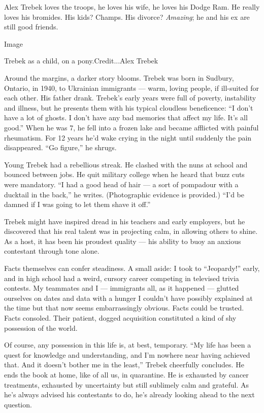 Alex Trebek loves the troops, he loves his wife, he loves his Dodge Ram.
He really loves his bromides. His kids? Champs. His divorce?
\emph{Amazing}; he and his ex are still good friends.

Image

Trebek as a child, on a pony.Credit...Alex Trebek

Around the margins, a darker story blooms. Trebek was born in Sudbury,
Ontario, in 1940, to Ukrainian immigrants --- warm, loving people, if
ill-suited for each other. His father drank. Trebek's early years were
full of poverty, instability and illness, but he presents them with his
typical cloudless beneficence: ``I don't have a lot of ghosts. I don't
have any bad memories that affect my life. It's all good.'' When he was
7, he fell into a frozen lake and became afflicted with painful
rheumatism. For 12 years he'd wake crying in the night until suddenly
the pain disappeared. ``Go figure,'' he shrugs.

Young Trebek had a rebellious streak. He clashed with the nuns at school
and bounced between jobs. He quit military college when he heard that
buzz cuts were mandatory. ``I had a good head of hair --- a sort of
pompadour with a ducktail in the back,'' he writes. (Photographic
evidence is provided.) ``I'd be damned if I was going to let them shave
it off.''

Trebek might have inspired dread in his teachers and early employers,
but he discovered that his real talent was in projecting calm, in
allowing others to shine. As a host, it has been his proudest quality
--- his ability to buoy an anxious contestant through tone alone.

Facts themselves can confer steadiness. A small aside: I took to
``Jeopardy!'' early, and in high school had a weird, cursory career
competing in televised trivia contests. My teammates and I ---
immigrants all, as it happened --- glutted ourselves on dates and data
with a hunger I couldn't have possibly explained at the time but that
now seems embarrassingly obvious. Facts could be trusted. Facts
consoled. Their patient, dogged acquisition constituted a kind of shy
possession of the world.

Of course, any possession in this life is, at best, temporary. ``My life
has been a quest for knowledge and understanding, and I'm nowhere near
having achieved that. And it doesn't bother me in the least,'' Trebek
cheerfully concludes. He ends the book at home, like of all us, in
quarantine. He is exhausted by cancer treatments, exhausted by
uncertainty but still sublimely calm and grateful. As he's always
advised his contestants to do, he's already looking ahead to the next
question.

